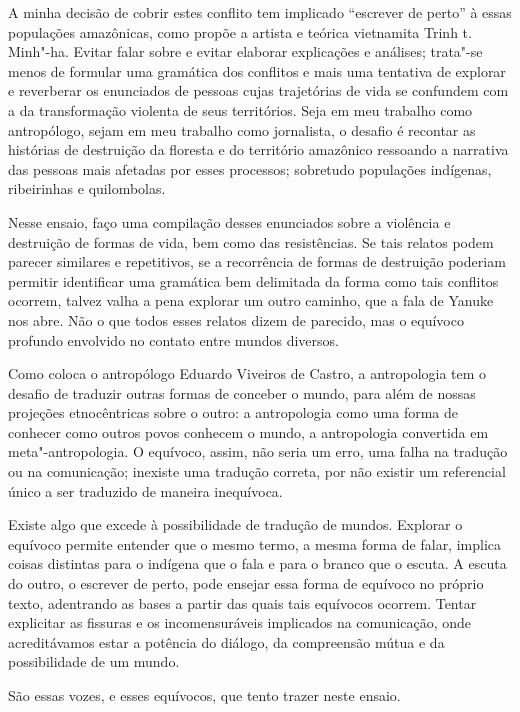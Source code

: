 A minha decisão de cobrir estes conflito tem implicado ``escrever de
perto'' à essas populações amazônicas, como propõe a artista e teórica
vietnamita Trinh t. Minh"-ha. Evitar falar sobre e evitar elaborar
explicações e análises; trata"-se menos de formular uma gramática dos
conflitos e mais uma tentativa de explorar e reverberar os enunciados de
pessoas cujas trajetórias de vida se confundem com a da transformação
violenta de seus territórios. Seja em meu trabalho como antropólogo,
sejam em meu trabalho como jornalista, o desafio é recontar as histórias
de destruição da floresta e do território amazônico ressoando a
narrativa das pessoas mais afetadas por esses processos; sobretudo
populações indígenas, ribeirinhas e quilombolas.

Nesse ensaio, faço uma compilação desses enunciados sobre a violência e
destruição de formas de vida, bem como das resistências. Se tais relatos
podem parecer similares e repetitivos, se a recorrência de formas de
destruição poderiam permitir identificar uma gramática bem delimitada da
forma como tais conflitos ocorrem, talvez valha a pena explorar um outro
caminho, que a fala de Yanuke nos abre. Não o que todos esses relatos
dizem de parecido, mas o equívoco profundo envolvido no contato entre
mundos diversos.

Como coloca o antropólogo Eduardo Viveiros de Castro, a antropologia tem
o desafio de traduzir outras formas de conceber o mundo, para além de
nossas projeções etnocêntricas sobre o outro: a antropologia como uma
forma de conhecer como outros povos conhecem o mundo, a antropologia
convertida em meta"-antropologia. O equívoco, assim, não seria um erro,
uma falha na tradução ou na comunicação; inexiste uma tradução correta,
por não existir um referencial único a ser traduzido de maneira
inequívoca.

Existe algo que excede à possibilidade de tradução de mundos. Explorar o
equívoco permite entender que o mesmo termo, a mesma forma de falar,
implica coisas distintas para o indígena que o fala e para o branco que
o escuta. A escuta do outro, o escrever de perto, pode ensejar essa
forma de equívoco no próprio texto, adentrando as bases a partir das
quais tais equívocos ocorrem. Tentar explicitar as fissuras e os
incomensuráveis implicados na comunicação, onde acreditávamos estar a
potência do diálogo, da compreensão mútua e da possibilidade de um
mundo.

São essas vozes, e esses equívocos, que tento trazer neste ensaio.

\asterisc

